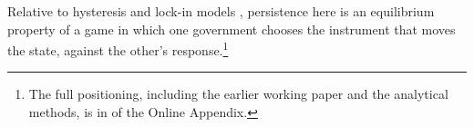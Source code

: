  Relative to hysteresis
and lock-in models \citep{Dixit1989,Krugman1991,Arthur1989,HasslerEtAl2003},
persistence here is an equilibrium property of a game in which one government chooses
the instrument that moves the state, against the other's response.\footnote{The full
positioning, including the earlier working paper and the analytical methods, is
in  of the Online Appendix.}

